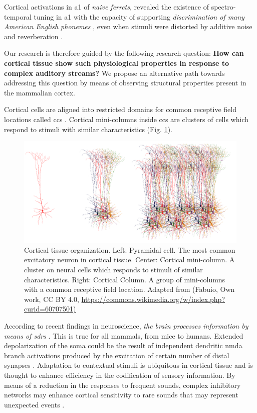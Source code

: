 \documentclass[10pt,letterpaper]{article}
\begin{document}
Cortical activations in \gls{a1} of \emph{naive ferrets}, revealed the existence of spectro-temporal tuning in \gls{a1} with the capacity of supporting \emph{discrimination of many American English phonemes} \cite{mesgarani_2008}, even when stimuli were distorted by additive noise and reverberation \cite{mesgarani_2014A}.

Our research is therefore guided by the following research question: \textbf{How can cortical tissue show such physiological properties in response to complex auditory streams?} We propose an alternative path towards addressing this question by means of observing structural properties present in the mammalian cortex.

Cortical cells are aligned into restricted domains for common receptive field locations called \glspl{cc} \cite{mountcastle_1955, mountcastle_1957, hubel_1962, hubel_1968}. Cortical mini-columns inside \glspl{cc} are clusters of cells which respond to stimuli with similar characteristics (Fig. \ref{fig:Biological}).

\begin{figure}[h!]
    \centering
    \includegraphics[width=1.0\textwidth]{Biological.png}
    \caption{Cortical tissue organization. Left: Pyramidal cell. The most common excitatory neuron in cortical tissue.
    Center: Cortical mini-column. A cluster on neural cells which responds to stimuli of similar characteristics.
    Right: Cortical Column. A group of mini-columns with a common receptive field location.
    Adapted from (Fabuio, Own work, CC BY 4.0, \url{https://commons.wikimedia.org/w/index.php?curid=60707501)}}
    \label{fig:Biological}
\end{figure}

According to recent findings in neuroscience,
\emph{the brain processes information by means of \glspl{sdr}}
\cite{barth_2012}.
This is true for all mammals, from mice to humans. Extended depolarization of the soma could be the result of independent dendritic \gls{nmda} branch activations produced by the excitation of certain number of distal synapses \cite{antic_2010, major_2013}. Adaptation to contextual stimuli is ubiquitous in cortical tissue and is thought to enhance efficiency in the codification of sensory information. By means of a reduction in the responses to frequent sounds, complex inhibitory networks may enhance cortical sensitivity to rare sounds that may represent unexpected events \cite{Natan2015ComplementaryCO,nachum_2003,Javitt11962}.
\end{document}
